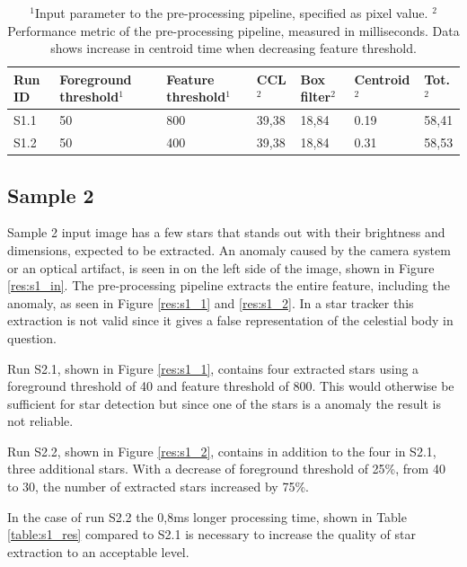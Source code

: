 \documentclass[12pt]{report}
\begin{document}
\begin{table}[!h]
    \centering
    \begin{tabular}{|p{0.8cm}|p{2.5cm}|p{2cm}||p{1.25cm}|p{1.25cm}|p{1.9cm}|p{1cm}|}
        \hline
        \textbf{Run ID}&\textbf{Foreground threshold$^{1}$}&\textbf{Feature threshold$^{1}$}&\textbf{CCL$^{2}$}&\textbf{Box filter$^{2}$}&\textbf{Centroid$^{2}$}&\textbf{Tot.$^{2}$}\\
        \hline
        \hline
        S1.1&50&800&39,38&18,84&0.19&58,41\\
        \hline
        S1.2&50&400&39,38&18,84&0.31&58,53\\
        \hline
    \end{tabular}
    \caption{$^{1}$Input parameter to the pre-processing pipeline, specified as pixel value. $^{2}$Performance metric of the pre-processing pipeline, measured in milliseconds. Data shows increase in centroid time when decreasing feature threshold.}
    \label{table:s0_res}
\end{table}

\subsection*{Sample 2}
Sample 2 input image has a few stars that stands out with their brightness and dimensions, expected to be extracted. An anomaly caused by the camera system or an optical artifact, is seen in on the left side of the image, shown in Figure \ref{res:s1_in}. The pre-processing pipeline extracts the entire feature, including the anomaly, as seen in Figure \ref{res:s1_1} and \ref{res:s1_2}. In a star tracker this extraction is not valid since it gives a false representation of the celestial body in question.
\par
Run S2.1, shown in Figure \ref{res:s1_1}, contains four extracted stars using a foreground threshold of 40 and feature threshold of 800. This would otherwise be sufficient for star detection but since one of the stars is a anomaly the result is not reliable.
\par
Run S2.2, shown in Figure \ref{res:s1_2}, contains in addition to the four in S2.1, three additional stars. With a decrease of foreground threshold of 25\%, from 40 to 30, the number of extracted stars increased by 75\%.
\par
In the case of run S2.2 the 0,8ms longer processing time, shown in Table \ref{table:s1_res} compared to S2.1 is necessary to increase the quality of star extraction to an acceptable level.
\end{document}
